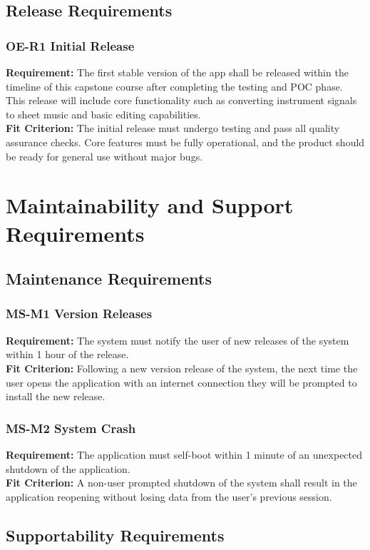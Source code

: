 \documentclass[12pt]{article}
\begin{document}
\subsection{Release Requirements}
\subsubsection*{OE-R1 Initial Release}
\textbf{Requirement:} The first stable version of the app shall be released within the timeline of this capstone course after completing the testing and POC phase. This release will include core functionality such as converting instrument signals to sheet music and basic editing capabilities.\\
\textbf{Fit Criterion:} The initial release must undergo testing and pass all quality assurance checks. Core features must be fully operational, and the product should be ready for general use without major bugs.


\section{Maintainability and Support Requirements}
\subsection{Maintenance Requirements}
\subsubsection*{MS-M1 Version Releases}
\textbf{Requirement:} The system must notify the user of new releases of the system within 1 hour of the release. \\ 
\textbf{Fit Criterion:} Following a new version release of the system, the next time the user opens the application with an internet connection they will be prompted to install the new release. 
\subsubsection*{MS-M2 System Crash}
\textbf{Requirement:} The application must self-boot within 1 minute of an unexpected shutdown of the application. \\ 
\textbf{Fit Criterion:} A non-user prompted shutdown of the system shall result in the application reopening without losing data from the user’s previous session.

\subsection{Supportability Requirements}
\end{document}
